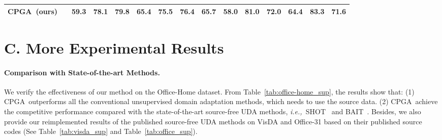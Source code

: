 \documentclass{article}
\def\ie{\emph{i.e.,~}}
\def\ournet{CPGA}
\newcommand{\cmark}{\ding{51}}\newcommand{\xmark}{\ding{55}}\renewcommand{\algorithmicrequire}{\textbf{Require:}}
\begin{document}
\begin{table*}[!h]
\begin{center}
{\begin{tabular}{lcccccccccccccc}
         \midrule
         \ournet~(ours) & \cmark & \textbf{59.3} & \textbf{78.1} & 79.8 & 65.4 & 75.5 & 76.4 & 65.7 & \textbf{58.0} & 81.0 & 72.0 & \textbf{64.4} & 83.3 & \textbf{71.6} \\
         \bottomrule
         \end{tabular}}
    \end{center}
    \caption{\label{tab:office-home_sup}. Classification accuracies (\%) on the Office-Home dataset (ResNet-50). We adopt underline to denote reimplemented results.}
\end{table*}

\section*{C. More Experimental Results} \label{sec:exp}

\paragraph{Comparison with State-of-the-art Methods.}

We verify the effectiveness of our method on the Office-Home dataset. From Table~\ref{tab:office-home_sup}, the results show that: (1) \ournet~outperforms all the conventional unsupervised domain adaptation methods, which needs to use the source data. (2) \ournet~achieve the competitive performance compared with the state-of-the-art source-free UDA methods, \ie SHOT~\cite{liang2020shot} and BAIT~\cite{Yang2020UnsupervisedDA}. Besides, we also provide our reimplemented results of the published source-free UDA methods on VisDA and Office-31 based on their published source codes (See Table~\ref{tab:visda_sup} and Table~\ref{tab:office_sup}).
\end{document}
